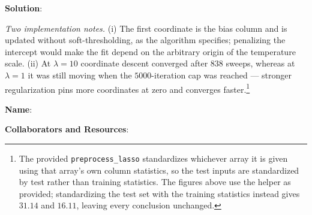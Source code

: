 \documentclass[submit]{../harvardml}
\newenvironment{solution}{
    \vspace{2mm}
    \color{blue}\noindent\textbf{Solution}:
}{}
\begin{document}
\begin{solution}
\begin{enumerate}
\noindent\emph{Two implementation notes.} (i) The first coordinate is the bias
column and is updated without soft-thresholding, as the algorithm specifies;
penalizing the intercept would make the fit depend on the arbitrary origin of
the temperature scale. (ii) At $\lambda = 10$ coordinate descent converged after
$838$ sweeps, whereas at $\lambda = 1$ it was still moving when the $5000$-iteration
cap was reached --- stronger regularization pins more coordinates at zero and
converges faster.\footnote{The provided \texttt{preprocess\_lasso} standardizes
whichever array it is given using that array's own column statistics, so the
test inputs are standardized by test rather than training statistics. The
figures above use the helper as provided; standardizing the test set with the
training statistics instead gives $31.14$ and $16.11$, leaving every conclusion
unchanged.}

\end{enumerate}

\end{solution}

\newpage

\textbf{Name}:

\textbf{Collaborators and Resources}:
\end{document}
